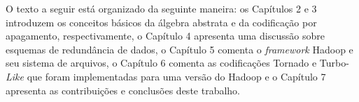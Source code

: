 O texto a seguir está organizado da seguinte maneira: os Capítulos 2 e 3
introduzem os conceitos básicos da álgebra abstrata e da codificação por apagamento, respectivamente, o Capítulo 4 apresenta uma discussão sobre esquemas de redundância de dados, o Capítulo 5 comenta o \emph{framework} Hadoop e seu sistema de arquivos, o Capítulo 6 comenta as codificações Tornado e Turbo-\emph{Like} que foram implementadas para uma versão do Hadoop e o Capítulo 7 apresenta as contribuições e conclusões deste trabalho.

